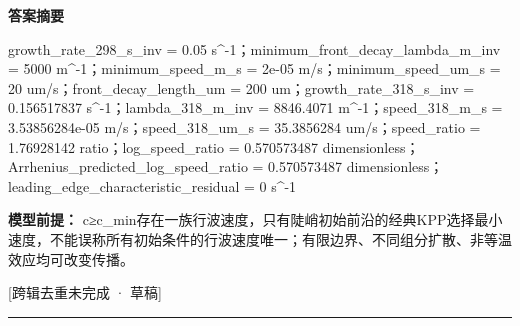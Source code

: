 \documentclass[UTF8,11pt,a4paper]{ctexart}
\begin{document}
\noindent\textbf{答案摘要}\par
growth\_rate\_298\_s\_inv = 0.05 s\textasciicircum{}-1；minimum\_front\_decay\_lambda\_m\_inv = 5000 m\textasciicircum{}-1；minimum\_speed\_m\_s = 2e-05 m/s；minimum\_speed\_um\_s = 20 um/s；front\_decay\_length\_um = 200 um；growth\_rate\_318\_s\_inv = 0.156517837 s\textasciicircum{}-1；lambda\_318\_m\_inv = 8846.4071 m\textasciicircum{}-1；speed\_318\_m\_s = 3.53856284e-05 m/s；speed\_318\_um\_s = 35.3856284 um/s；speed\_ratio = 1.76928142 ratio；log\_speed\_ratio = 0.570573487 dimensionless；Arrhenius\_predicted\_log\_speed\_ratio = 0.570573487 dimensionless；leading\_edge\_characteristic\_residual = 0 s\textasciicircum{}-1\par
\noindent\textbf{模型前提：}
c≥c\_min存在一族行波速度，只有陡峭初始前沿的经典KPP选择最小速度，不能误称所有初始条件的行波速度唯一；有限边界、不同组分扩散、非等温效应均可改变传播。\par
\noindent\textcolor{red!65!black}{[跨辑去重未完成 · 草稿]} \par
\medskip\hrule\medskip
{}
\end{document}
